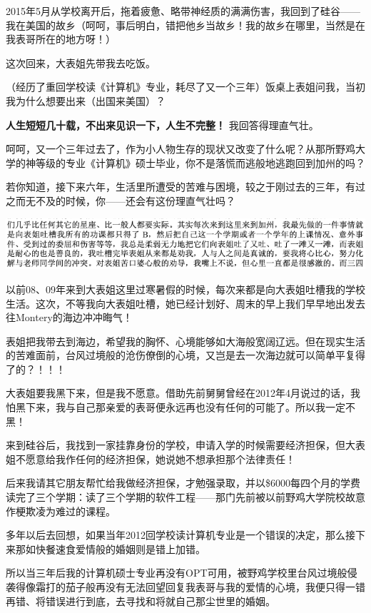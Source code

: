 \documentclass[9pt, b5paper]{article}
\begin{document}
2015年5月从学校离开后，拖着疲惫、略带神经质的满满伤害，我回到了硅谷——我在美国的故乡（呵呵，事后明白，错把他乡当故乡！我的故乡在哪里，当然是在我表哥所在的地方呀！）

这次回来，大表姐先带我去吃饭。

（经历了重回学校读《计算机》专业，耗尽了又一个三年）饭桌上表姐问我，当初我为什么想要出来（出国来美国）？

\textbf{人生短短几十载，不出来见识一下，人生不完整！} 我回答得理直气壮。

呵呵，又一个三年过去了，作为小人物生存的现状又改变了什么呢？从那所野鸡大学的神等级的专业《计算机》硕士毕业，你不是落慌而逃般地逃跑回到加州的吗？

若你知道，接下来六年，生活里所遭受的苦难与困境，较之于刚过去的三年，有过之而无不及的时候，你——还会有这份理直气壮吗？

\begin{center}
\includegraphics[width=.9\linewidth]{./pic/backups_plans_20210426_094357.png}
\end{center}

以前08、09年来到大表姐这里过寒暑假的时候，每次来都是向大表姐吐槽我的学校生活。这次，不等我向大表姐吐槽，她已经计划好、周末的早上我们早早地出发去往Montery的海边冲冲晦气！

表姐把我带去到海边，希望我的胸怀、心境能够如大海般宽阔辽远。但在现实生活的苦难面前，台风过境般的沧伤僚倒的心境，又岂是去一次海边就可以简单平复得了的？！！！

大表姐要我黑下来，但是我不愿意。借助先前舅舅曾经在2012年4月说过的话，我怕黑下来，我与自己那亲爱的表哥便永远再也没有任何的可能了。所以我一定不黑！

来到硅谷后，我找到一家挂靠身份的学校，申请入学的时候需要经济担保，但大表姐不愿意给我作任何的经济担保，她说她不想承担那个法律责任！

后来我请其它朋友帮忙给我做经济担保，才勉强录取，并以\$6000每四个月的学费读完了三个学期：读了三个学期的软件工程——那门先前被以前野鸡大学院校故意作梗欺凌为难过的课程。

多年以后去回想，如果当年2012回学校读计算机专业是一个错误的决定，那么接下来那如快餐速食爱情般的婚姻则是错上加错。

所以当三年后我的计算机硕士专业再没有OPT可用，被野鸡学校里台风过境般侵袭得像霜打的茄子般再没有无法回望回复我表哥与我的爱情的心境，我便只得一错再错、将错误进行到底，去寻找和将就自己那尘世里的婚姻。
\end{document}
